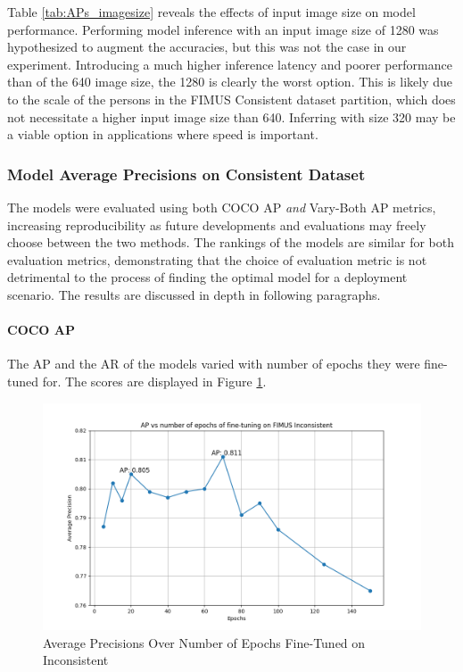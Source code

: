 Table \ref{tab:APs_imagesize} reveals the effects of input image size on model performance. Performing model inference with an input image size of 1280 was hypothesized to augment the accuracies, but this was not the case in our experiment. Introducing a much higher inference latency and poorer performance than of the 640 image size, the 1280 is clearly the worst option. This is likely due to the scale of the persons in the FIMUS Consistent dataset partition, which does not necessitate a higher input image size than 640. Inferring with size 320 may be a viable option in applications where speed is important.  

\subsubsection{Model Average Precisions on Consistent Dataset}
The models were evaluated using both COCO AP \textit{and} Vary-Both AP metrics, increasing reproducibility as future developments and evaluations may freely choose between the two methods. The rankings of the models are similar for both evaluation metrics, demonstrating that the choice of evaluation metric is not detrimental to the process of finding the optimal model for a deployment scenario. The results are discussed in depth in following paragraphs.

\paragraph{COCO AP}
The AP and the AR of the models varied with number of epochs they were fine-tuned for. The scores are displayed in Figure \ref{fig:plot_AP_COCO}.

\begin{figure}[H]
    \centering
    \includegraphics[width=\textwidth]{Images/Analytics/plot_AP_coco.png}
    \caption{Average Precisions Over Number of Epochs Fine-Tuned on Inconsistent}
    \label{fig:plot_AP_COCO}
\end{figure}

